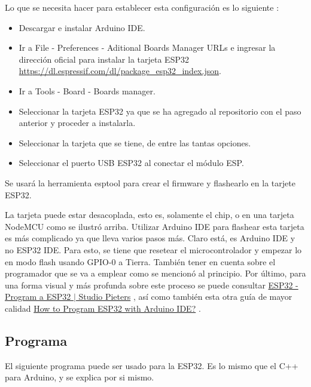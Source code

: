 \documentclass[conference]{IEEEtran}
\begin{document}
\bigbreak

Lo que se necesita hacer para establecer esta configuración es lo siguiente \cite{pieters-2022}:

\begin{itemize}
\item Descargar e instalar Arduino IDE.

\item Ir a File - Preferences - Aditional Boards Manager URLs e ingresar la dirección oficial para instalar la tarjeta ESP32 \url{https://dl.espressif.com/dl/package_esp32_index.json}.

\item Ir a Tools - Board - Boards manager.

\item Seleccionar la tarjeta ESP32 ya que se ha agregado al repositorio con el paso anterior y proceder a instalarla.

\item Seleccionar la tarjeta que se tiene, de entre las tantas opciones.

\item Seleccionar el puerto USB ESP32 al conectar el módulo ESP.
\end{itemize}

Se usará la herramienta esptool para crear el firmware y flashearlo en la tarjete ESP32.

\bigbreak

La tarjeta puede estar desacoplada, esto es, solamente el chip, o en una tarjeta NodeMCU como se ilustró arriba. Utilizar Arduino IDE para flashear esta tarjeta es más complicado ya que lleva varios pasos más. Claro está, es Arduino IDE y no ESP32 IDE. Para esto, se tiene que resetear el microcontrolador y empezar lo en modo flash usando GPIO-0 a Tierra. También tener en cuenta sobre el programador que se va a emplear como se mencionó al principio. Por último, para una forma visual y más profunda sobre este proceso se puede consultar \href{https://www.studiopieters.nl/esp32-program-a-esp32}{ESP32 - Program a ESP32 $\mid$ Studio Pieters} \cite{pieters-2022}, así como también esta otra guía de mayor calidad \href{https://www.electronicshub.org/esp32-arduino-ide}{How to Program ESP32 with Arduino IDE?} \cite{teja-2021}.

\subsection{Programa}

El siguiente programa puede ser usado para la ESP32. Es lo mismo que el C++ para Arduino, y se explica por si mismo.
\end{document}
